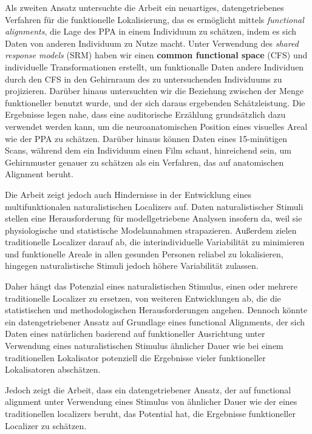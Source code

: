 Als zweiten Ansatz untersuchte die Arbeit ein neuartiges, datengetriebenes Verfahren für die
funktionelle Lokalisierung, das es ermöglicht mittels \textit{functional
alignments}, die Lage des PPA in einem Individuum zu schätzen, indem es sich
Daten von anderen Individuum zu Nutze macht.
%
Unter Verwendung des \textit{shared response models} (SRM) haben wir einen
\textbf{common functional space} (CFS) und individuelle Transformationen
erstellt, um funktionalle Daten andere Individuen durch den CFS in den
Gehirnraum des zu untersuchenden Individuums zu projizieren.
%
Darüber hinaus untersuchten wir die Beziehung zwischen der Menge funktioneller
benutzt wurde, und der sich daraus ergebenden Schätzleistung.
Die Ergebnisse legen nahe, dass eine auditorische Erzählung grundsätzlich dazu
verwendet werden kann, um die neuroanatomischen Position eines visuelles Areal
wie der PPA zu schätzen.
%
Darüber hinaus können Daten eines 15-minütigen Scans, während dem ein
Individuum einen Film schaut, hinreichend sein, um Gehirnmuster genauer zu
schätzen als ein Verfahren, das auf anatomischen Alignment beruht.

Die Arbeit zeigt jedoch auch Hindernisse in der Entwicklung eines
multifunktionalen naturalistischen Localizers auf.
%
Daten naturalistischer Stimuli stellen eine Herausforderung für
modellgetriebene Analysen insofern da, weil sie physiologische und statistische
Modelannahmen strapazieren.
%
Außerdem zielen traditionelle Localizer darauf ab, die interindividuelle
Variabilität zu minimieren und funktionelle Areale in allen gesunden Personen
reliabel zu lokalisieren, hingegen naturalistische Stimuli jedoch höhere
Variabilität zulassen.

Daher hängt das Potenzial eines naturalistischen Stimulus, einen oder mehrere
traditionelle Localizer zu ersetzen, von weiteren Entwicklungen ab, die die
statistischen und methodologischen Herausforderungen angehen.
%
Dennoch könnte ein datengetriebener Ansatz auf Grundlage eines functional Alignments,
 der sich Daten eines natürlichen
basierend auf funktioneller Ausrichtung unter
Verwendung eines naturalistischen Stimulus ähnlicher Dauer wie bei einem
traditionellen Lokalisator potenziell die Ergebnisse vieler funktioneller
Lokalisatoren abschätzen.

Jedoch zeigt die Arbeit, dass ein datengetriebener Ansatz, der auf functional
alignment unter Verwendung eines Stimulus von ähnlicher Dauer wie der eines
traditionellen localizers beruht, das Potential hat, die Ergebnisse
funktioneller Localizer zu schätzen.

